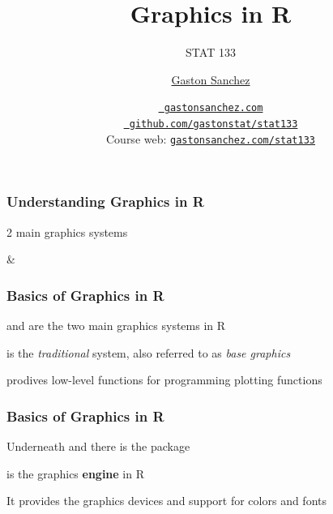 \documentclass[12pt]{beamer}\usepackage[]{graphicx}\usepackage[]{color}
\title{Graphics in R}
\subtitle{STAT 133}
\author{\href{http://www.gastonsanchez.com}{Gaston Sanchez}}
\institute{Department of Statistics, UC{\textendash}Berkeley}
\date{\href{http://www.gastonsanchez.com}{\tt \scriptsize \color{foreground} gastonsanchez.com}
\\[-4pt]
\href{http://github.com/gastonstat/stat133}{\tt \scriptsize \color{foreground} github.com/gastonstat/stat133}
\\[-4pt]
{\scriptsize Course web: \href{http://www.gastonsanchez.com/stat133}{\tt gastonsanchez.com/stat133}}
}
\begin{document}
{
  \frame{
    \titlepage
  } 
}


\begin{frame}
\begin{center}
\Huge{}
\end{center}
\end{frame}


\begin{frame}
\frametitle{Understanding Graphics in R}

\centerline{\mdlit \Large 2 main graphics systems}

\bigskip
\centerline{\Large {} \quad \& \quad {}}

\end{frame}


\begin{frame}
\frametitle{Basics of Graphics in R}

\bbi
  \item {} and  are the two main graphics systems in R
  \item {} is the \textit{traditional} system, also referred to as \textit{base graphics}
  \item {} prodives low-level functions for programming plotting functions
\ei
\eb

\end{frame}


\begin{frame}
\frametitle{Basics of Graphics in R}

\bbi
  \item Underneath  and  there is the package 
  \item {} is the graphics \textbf{engine} in R
  \item It provides the graphics devices and support for colors and fonts
\ei
\eb

\end{frame}

\end{document}
